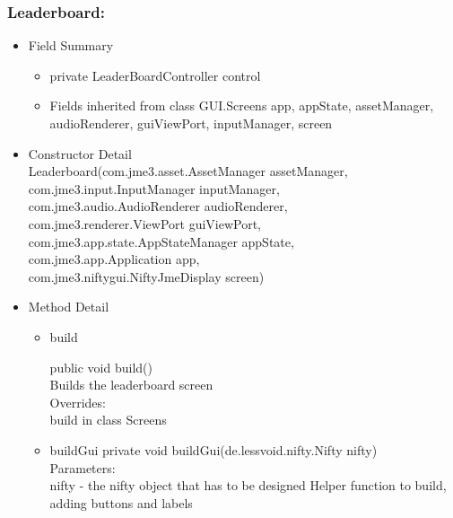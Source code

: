 \documentclass[letterpaper]{article}
\begin{document}
									\subsubsection*{Leaderboard:}
								\vspace{0.1in}	
									\begin{itemize}
										\item	Field Summary
												\begin{itemize}
				\item private LeaderBoardController 	control 
				\item Fields inherited from class GUI.Screens
		app, appState, assetManager, audioRenderer, guiViewPort, inputManager, screen
				\end{itemize}
										\item	Constructor Detail \\
										Leaderboard(com.jme3.asset.AssetManager assetManager,\\								 com.jme3.input.InputManager inputManager, \\ com.jme3.audio.AudioRenderer audioRenderer, \\ com.jme3.renderer.ViewPort guiViewPort, \\ com.jme3.app.state.AppStateManager appState, \\ com.jme3.app.Application app, \\ com.jme3.niftygui.NiftyJmeDisplay screen) \\
										\item	Method Detail
												\begin{itemize}
								\item	
		    build
		
		    public void build() \\
		
		    Builds the leaderboard screen \\ 
		
		    Overrides: \\
		        build in class Screens \\
													\item buildGui
														private void buildGui(de.lessvoid.nifty.Nifty nifty) \\
		
		Parameters: \\
		    nifty - the nifty object that has to be designed Helper function to build, adding buttons and labels \\
												\end{itemize}
									\end{itemize}
\end{document}
